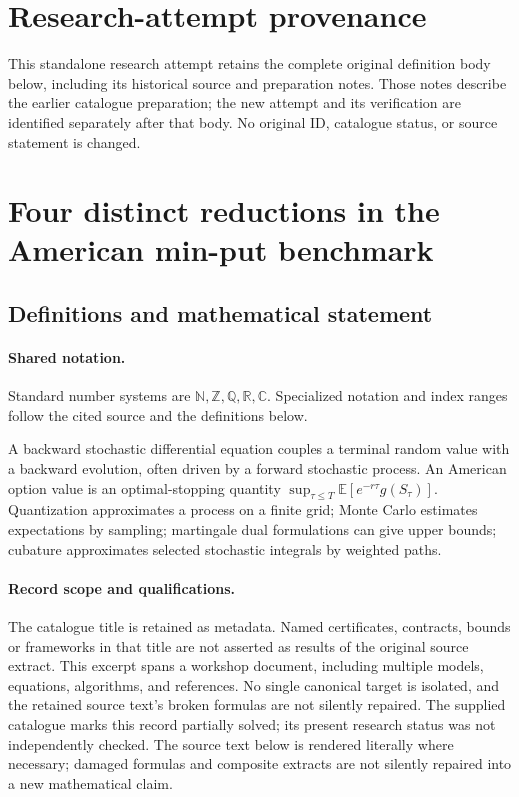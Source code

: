 \documentclass[11pt]{article}
\begin{document}
\section*{Research-attempt provenance}
This standalone research attempt retains the complete original definition body below,
including its historical source and preparation notes. Those notes describe the
earlier catalogue preparation; the new attempt and its verification are identified
separately after that body. No original ID, catalogue status, or source statement is changed.

\section{Four distinct reductions in the American min-put benchmark}\label{statement}

\subsection{Definitions and mathematical statement}

\paragraph{Shared notation.}Standard number systems are $\mathbb N,\mathbb Z,\mathbb Q,\mathbb R,\mathbb C$. Specialized notation and index ranges follow the cited source and the definitions below.


A backward stochastic differential equation couples a terminal random value with a backward evolution, often driven by a forward stochastic process. An American option value is an optimal-stopping quantity $\sup_{\tau\leq T}\mathbb E[e^{-r\tau}g(S_\tau)]$. Quantization approximates a process on a finite grid; Monte Carlo estimates expectations by sampling; martingale dual formulations can give upper bounds; cubature approximates selected stochastic integrals by weighted paths.
\paragraph{Record scope and qualifications.}
The catalogue title is retained as metadata. Named certificates, contracts, bounds or frameworks in that title are not asserted as results of the original source extract.
This excerpt spans a workshop document, including multiple models, equations, algorithms, and references. No single canonical target is isolated, and the retained source text's broken formulas are not silently repaired. The supplied catalogue marks this record partially solved; its present research status was not independently checked.
The source text below is rendered literally where necessary; damaged formulas and composite extracts are not silently repaired into a new mathematical claim.
\end{document}
